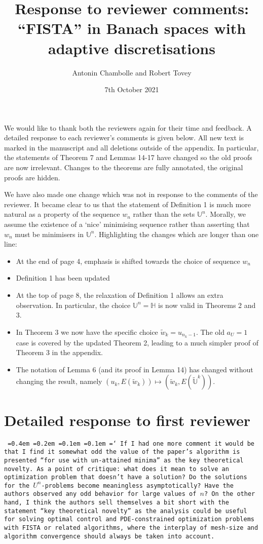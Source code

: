 \documentclass[12pt]{article}
\title{Response to reviewer comments:\\``FISTA'' in Banach spaces with adaptive discretisations}
\author{Antonin Chambolle and Robert Tovey}
\date{7th October 2021}
\newcommand*\justify{%
	\fontdimen2\font=0.4em%
	\fontdimen3\font=0.2em%
	\fontdimen4\font=0.1em%
	\fontdimen7\font=0.1em%
	\hyphenchar\font=`\-%
}
\newcommand{\review}[1]{\texttt{\justify{#1}}}
\newcommand{\F}[1]{\mathbb{#1}}
\begin{document}
\maketitle

We would like to thank both the reviewers again for their time and feedback. A detailed response to each reviewer's comments is given below. All new text is marked in the manuscript and all deletions outside of the appendix. In particular, the statements of Theorem 7 and Lemmas 14-17 have changed so the old proofs are now irrelevant. Changes to the theorems are fully annotated, the original proofs are hidden.

We have also made one change which was not in response to the comments of the reviewer. It became clear to us that the statement of Definition 1 is much more natural as a property of the sequence $w_n$ rather than the sets $\F{U}^n$. Morally, we assume the existence of a `nice' minimising sequence rather than asserting that $w_n$ must be minimisers in $\F{U}^n$. Highlighting the changes which are longer than one line:
\begin{itemize}
	\item At the end of page 4, emphasis is shifted towards the choice of sequence $w_n$
	\item Definition 1 has been updated
	\item At the top of page 8, the relaxation of Definition 1 allows an extra observation. In particular, the choice $\F{U}^n=\F H$ is now valid in Theorems 2 and 3.
	\item In Theorem 3 we now have the specific choice $\tilde{w}_k = u_{n_k-1}$. The old $a_U=1$ case is covered by the updated Theorem 2, leading to a much simpler proof of Theorem 3 in the appendix.
	\item The notation of Lemma 6 (and its proof in Lemma 14) has changed without changing the result, namely $(u_k,E(\tilde{w}_k))\mapsto (\tilde{w}_k, E(\tilde{\F{U}}^k))$.
\end{itemize}


\section{Detailed response to first reviewer}
\review{If I had one more comment it would be that I find it somewhat odd the value of the paper's algorithm is presented ``for use with un-attained minima'' as the key theoretical novelty. As a point of critique: what does it mean to solve an optimization problem that doesn't have a solution? Do the solutions for the $U^n$-problems become meaningless asymptotically? Have the authors observed any odd behavior for large values of $n$? On the other hand, I think the authors sell themselves a bit short with the statement ``key theoretical novelty'' as the analysis could be useful for solving optimal control and PDE-constrained optimization problems with FISTA or related algorithms, where the interplay of mesh-size and algorithm convergence should always be taken into account.}
\end{document}
